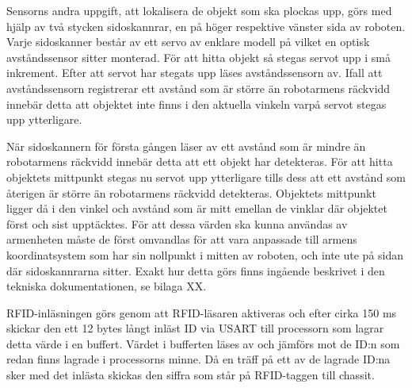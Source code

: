 Sensorns andra uppgift, att lokalisera de objekt som ska plockas upp, görs med hjälp av två stycken sidoskannrar, en på höger respektive vänster sida av roboten. Varje sidoskanner består av ett servo av enklare modell på vilket en optisk avståndssensor sitter monterad. För att hitta objekt så stegas servot upp i små inkrement. Efter att servot har stegats upp läses avståndssensorn av. Ifall att avståndssensorn registrerar ett avstånd som är större än robotarmens räckvidd innebär detta att objektet inte finns i den aktuella vinkeln varpå servot stegas upp ytterligare.

När sidoskannern för första gången läser av ett avstånd som är mindre än robotarmens räckvidd innebär detta att ett objekt har detekteras. För att hitta objektets mittpunkt stegas nu servot upp ytterligare tills dess att ett avstånd som återigen är större än robotarmens räckvidd detekteras. Objektets mittpunkt ligger då i den vinkel och avstånd som är mitt emellan de vinklar där objektet först och sist upptäcktes. För att dessa värden ska kunna användas av armenheten måste de först omvandlas för att vara anpassade till armens koordinatsystem som har sin nollpunkt i mitten av roboten, och inte ute på sidan där sidoskannrarna sitter. Exakt hur detta görs finns ingående beskrivet i den tekniska dokumentationen, se bilaga XX.

RFID-inläsningen görs genom att RFID-läsaren aktiveras och efter cirka 150 ms skickar den ett 12 bytes långt inläst ID via USART till processorn som lagrar detta värde i en buffert. Värdet i bufferten läses av och jämförs mot de ID:n som redan finns lagrade i processorns minne. Då en träff på ett av de lagrade ID:na sker med det inlästa skickas den siffra som står på RFID-taggen till chassit. 




